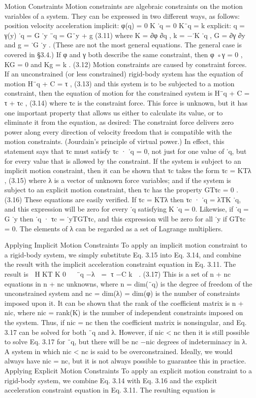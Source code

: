 Motion Constraints Motion constraints are algebraic constraints on the motion variables of a system. They can be expressed in two different ways, as follows: position velocity acceleration implicit: φ(q) = 0 K ˙q = 0 K¨q = k explicit: q = γ(y) ˙q = G ˙y ¨q = G¨y + g (3.11) where K = ∂φ ∂q , k = −˙K ˙q , G = ∂γ ∂y and g = ˙G ˙y . (These are not the most general equations. The general case is covered in §3.4.) If φ and γ both describe the same constraint, then φ ◦γ = 0 , KG = 0 and Kg = k . (3.12) Motion constraints are caused by constraint forces. If an unconstrained (or less constrained) rigid-body system has the equation of motion H¨q + C = τ , (3.13) and this system is to be subjected to a motion constraint, then the equation of motion for the constrained system is H¨q + C = τ + τc , (3.14) where τc is the constraint force. This force is unknown, but it has one important property that allows us either to calculate its value, or to eliminate it from the equation, as desired: The constraint force delivers zero power along every direction of velocity freedom that is compatible with the motion constraints. (Jourdain’s principle of virtual power.) In effect, this statement says that τc must satisfy τc · ˙q = 0, not just for one value of ˙q, but for every value that is allowed by the constraint. If the system is subject to an implicit motion constraint, then it can be shown that τc takes the form τc = KTλ , (3.15) where λ is a vector of unknown force variables; and if the system is subject to an explicit motion constraint, then τc has the property GTτc = 0 . (3.16) These equations are easily verified. If τc = KTλ then τc · ˙q = λTK ˙q, and this expression will be zero for every ˙q satisfying K ˙q = 0. Likewise, if ˙q = G ˙y then ˙q · τc = ˙yTGTτc, and this expression will be zero for all ˙y if GTτc = 0. The elements of λ can be regarded as a set of Lagrange multipliers.

Applying Implicit Motion Constraints To apply an implicit motion constraint to a rigid-body system, we simply substitute Eq. 3.15 into Eq. 3.14, and combine the result with the implicit acceleration constraint equation in Eq. 3.11. The result is  H KT K 0   ¨q −λ  = τ −C k  . (3.17) This is a set of n + nc equations in n + nc unknowns, where n = dim(¨q) is the degree of freedom of the unconstrained system and nc = dim(λ) = dim(φ) is the number of constraints imposed upon it. It can be shown that the rank of the coefficient matrix is n + nic, where nic = rank(K) is the number of independent constraints imposed on the system. Thus, if nic = nc then the coefficient matrix is nonsingular, and Eq. 3.17 can be solved for both ¨q and λ. However, if nic < nc then it is still possible to solve Eq. 3.17 for ¨q, but there will be nc −nic degrees of indeterminacy in λ. A system in which nic < nc is said to be overconstrained. Ideally, we would always have nic = nc, but it is not always possible to guarantee this in practice. Applying Explicit Motion Constraints To apply an explicit motion constraint to a rigid-body system, we combine Eq. 3.14 with Eq. 3.16 and the explicit acceleration constraint equation in Eq. 3.11. The resulting equation is

